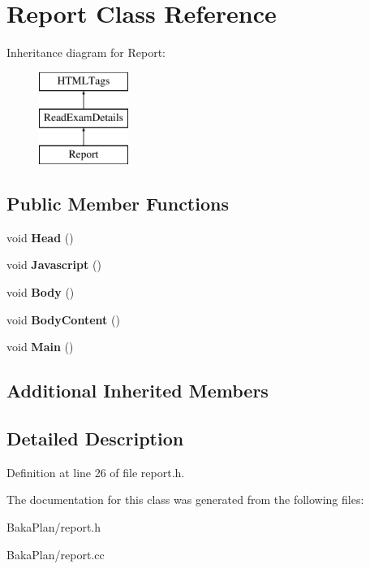 \hypertarget{classReport}{\section{Report Class Reference}
\label{classReport}
}
Inheritance diagram for Report\-:\begin{figure}[H]
\begin{center}
\leavevmode
\includegraphics[height=3.000000cm]{classReport}
\end{center}
\end{figure}
\subsection*{Public Member Functions}
\begin{DoxyCompactItemize}
\item 
\hypertarget{classReport_a6b5a749dcbc19cb71503c5a6e2d465d3}{void {\bfseries Head} ()}\label{classReport_a6b5a749dcbc19cb71503c5a6e2d465d3}

\item 
\hypertarget{classReport_a97998b106d6fb7d6ccfea849892d21ee}{void {\bfseries Javascript} ()}\label{classReport_a97998b106d6fb7d6ccfea849892d21ee}

\item 
\hypertarget{classReport_a28dfc98e680194276c2bbb2fa4decf86}{void {\bfseries Body} ()}\label{classReport_a28dfc98e680194276c2bbb2fa4decf86}

\item 
\hypertarget{classReport_abfacfc97c910b8c2bc1a1102cc623d80}{void {\bfseries Body\-Content} ()}\label{classReport_abfacfc97c910b8c2bc1a1102cc623d80}

\item 
\hypertarget{classReport_a35895231f3a27c3247f9498cda2b42fe}{void {\bfseries Main} ()}\label{classReport_a35895231f3a27c3247f9498cda2b42fe}

\end{DoxyCompactItemize}
\subsection*{Additional Inherited Members}


\subsection{Detailed Description}


Definition at line 26 of file report.\-h.



The documentation for this class was generated from the following files\-:\begin{DoxyCompactItemize}
\item 
Baka\-Plan/report.\-h\item 
Baka\-Plan/report.\-cc\end{DoxyCompactItemize}
